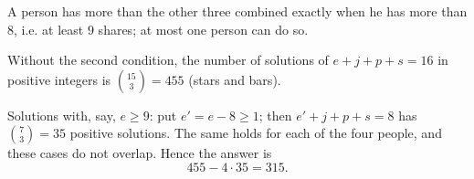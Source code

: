 A person has more than the other three combined exactly when he has more than $8$, i.e. at least $9$ shares; at most one person can do so.

Without the second condition, the number of solutions of $e+j+p+s=16$ in positive integers is $\binom{15}{3}=455$ (stars and bars).

Solutions with, say, $e\ge9$: put $e'=e-8\ge1$; then $e'+j+p+s=8$ has $\binom73=35$ positive solutions. The same holds for each of the four people, and these cases do not overlap. Hence the answer is
\[
455-4\cdot35=\boxed{315}.
\]
